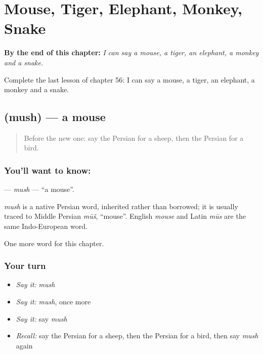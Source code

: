 
\chapter{Mouse, Tiger, Elephant, Monkey, Snake}
\label{ch:fa-mouse-tiger-elephant-monkey-snake}

\begin{chapteropening}
\textbf{By the end of this chapter:} \emph{I can say a mouse, a tiger, an elephant, a monkey and a snake.}

Complete the last lesson of chapter 56: I can say a mouse, a tiger, an elephant, a monkey and a snake.
\end{chapteropening}

\section[\texorpdfstring{\fa{موش} (mush)}{موش (mush)}]{ (mush) — a mouse}

\label{lesson:FA-C56-mush}



\begin{quote}
Before the new one: say the Persian for a sheep, then the Persian for a bird.
\end{quote}

\subsection*{You'll want to know: }
\textbf{} — \emph{mush} — \textquotedblleft{}a mouse\textquotedblright{}.

\begin{cousinweb}
\emph{mush} is a native Persian word, inherited rather than borrowed; it is usually traced to Middle Persian \emph{mūš}, \textquotedblleft{}mouse\textquotedblright{}. English \emph{mouse} and Latin \emph{mūs} are the same Indo-European word.
\end{cousinweb}

\begin{grammarlens}[title={What you've built}]
One more word for this chapter.
\end{grammarlens}

\subsection*{Your turn}
\begin{itemize}
\raggedright
  \item \emph{Say it:} \emph{mush}
  \item \emph{Say it:} \emph{mush}, once more
  \item \emph{Say it:} say \emph{mush}
  \item \emph{Recall:} say the Persian for a sheep, then the Persian for a bird, then say \emph{mush} again
\end{itemize}

